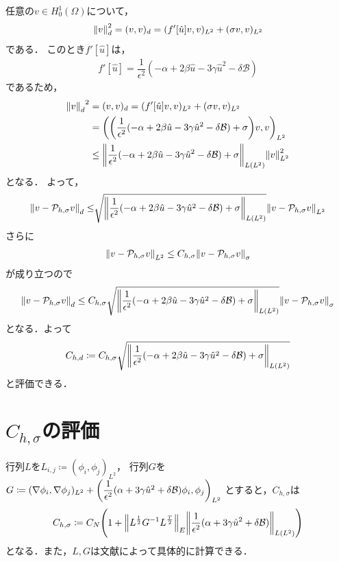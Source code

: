 任意の\( v \in H^1_0(\Omega)\)について，
\begin{align}
  \norm{v}^2_d =(v,v)_d =(f'[\hat{u}]v,v)_{L^2}+(\sigma v,v)_{L^2}
\end{align}
である．
このとき\(f'[\hat{u}]\)は，
\begin{align}
  f'[\hat{u}]=\dfrac{1}{\epsilon^2}(-\alpha+2\beta\hat{u}-3\gamma\hat{u}^2-\delta\mathcal{B})
\end{align}
であるため，
\begin{align}
  {\norm{v}_d}^2 &=(v,v)_d =(f'[\hat{u}]v,v)_{L^2}+(\sigma v,v)_{L^2}\\
  &=\qty(\qty(\dfrac{1}{\epsilon^2}(-\alpha+2\beta\hat{u}-3\gamma\hat{u}^2-\delta\mathcal{B})+\sigma)v,v)_{L^2}\\
  &\leq\norm{\dfrac{1}{\epsilon^2}(-\alpha+2\beta\hat{u}-3\gamma\hat{u}^2-\delta\mathcal{B})+\sigma}_{L(L^2)}\norm{v}_{L^2}^2
\end{align}
となる．
よって，
\begin{align}
  \norm{v-\mathcal{P}_{h,\sigma }v}_d 
  \leq&\sqrt{\norm{\dfrac{1}{\epsilon^2}(-\alpha+2\beta\hat{u}-3\gamma\hat{u}^2-\delta\mathcal{B})+\sigma}_{L(L^2)}}\norm{v-\mathcal{P}_{h,\sigma }v}_{L^2}\\
\end{align}
さらに
\begin{align}
  \norm{v-\mathcal{P}_{h,\sigma }v}_{L^2}
  \leq
  C_{h,\sigma }\norm{v-\mathcal{P}_{h,\sigma }v}_{\sigma }
\end{align}
が成り立つので
\begin{align}
  \norm{v-\mathcal{P}_{h,\sigma }v}_d\leq C_{h,\sigma }\sqrt{\norm{\dfrac{1}{\epsilon^2}(-\alpha+2\beta\hat{u}-3\gamma\hat{u}^2-\delta\mathcal{B})+\sigma}_{L(L^2)}}\norm{v-\mathcal{P}_{h,\sigma }v}_{\sigma }
\end{align}
となる．よって
\begin{align}
  C_{h,d}\coloneqq C_{h,\sigma }\sqrt{\norm{\dfrac{1}{\epsilon^2}(-\alpha+2\beta\hat{u}-3\gamma\hat{u}^2-\delta\mathcal{B})+\sigma}_{L(L^2)}}
\end{align}
と評価できる．
\section{\(C_{h,\sigma}\)の評価}
行列\(L\)を\(L_{i,j}\coloneqq(\phi_i,\phi_j)_{L^2}\)，
行列\(G\)を
\(G\coloneqq (\nabla\phi_i,\nabla\phi_j)_{L^2}
+\qty(\dfrac{1}{\epsilon^2}(\alpha+3\gamma \hat{u}^2 + \delta \mathcal{B} )\phi_i,\phi_j)_{L^2}\)
とすると，\(C_{h,\sigma}\)は
\begin{align}
  C_{h,\sigma} \coloneqq 
  C_N\qty
  (
    1+\norm{L^{\frac{1}{2}}G^{-1}L^{\frac{T}{2}}}_E
    \norm{\dfrac{1}{\epsilon^2}(\alpha+3\gamma \hat{u}^2 + \delta \mathcal{B} )}_{L(L^2)}
  )
\end{align}
となる．また，\(L,G\)は文献\cite{booknakao}によって具体的に計算できる．

